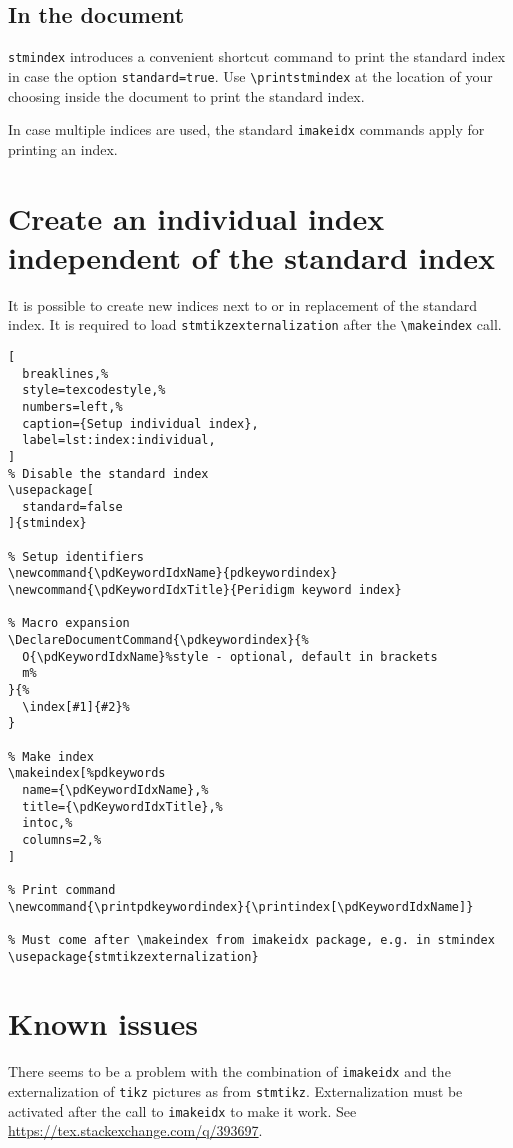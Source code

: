 \documentclass[%
  type=article,%
  layout=koma,%
  conditionallox=true,%
  conditionalloxnewpage=false,%
  date=true,%
  hyperref=true,%
  index=false,%
  listings=true%
]{stmtext}
\begin{document}
\subsection{In the document}

\texttt{stmindex} introduces a convenient shortcut command to print the standard index in case the option \texttt{standard=true}. Use \verb+\printstmindex+ at the location of your choosing inside the document to print the standard index.

In case multiple indices are used, the standard \texttt{imakeidx} commands apply for printing an index.

\section{Create an individual index independent of the standard index}

It is possible to create new indices next to or in replacement of the standard index. It is required to load \texttt{stmtikzexternalization} after the \texttt{\textbackslash makeindex} call.

\begin{lstlisting}[
  breaklines,%
  style=texcodestyle,%
  numbers=left,%
  caption={Setup individual index},
  label=lst:index:individual,
]
% Disable the standard index
\usepackage[
  standard=false
]{stmindex}

% Setup identifiers
\newcommand{\pdKeywordIdxName}{pdkeywordindex}
\newcommand{\pdKeywordIdxTitle}{Peridigm keyword index}

% Macro expansion
\DeclareDocumentCommand{\pdkeywordindex}{%
  O{\pdKeywordIdxName}%style - optional, default in brackets
  m%
}{%
  \index[#1]{#2}%
}

% Make index
\makeindex[%pdkeywords
  name={\pdKeywordIdxName},%
  title={\pdKeywordIdxTitle},%
  intoc,%
  columns=2,%
]

% Print command
\newcommand{\printpdkeywordindex}{\printindex[\pdKeywordIdxName]}

% Must come after \makeindex from imakeidx package, e.g. in stmindex
\usepackage{stmtikzexternalization}
\end{lstlisting}

\section{Known issues}

There seems to be a problem with the combination of \texttt{imakeidx} and the externalization of \texttt{tikz} pictures as from \texttt{stmtikz}. Externalization must be activated after the call to \texttt{imakeidx} to make it work. See \url{https://tex.stackexchange.com/q/393697}.
\end{document}
